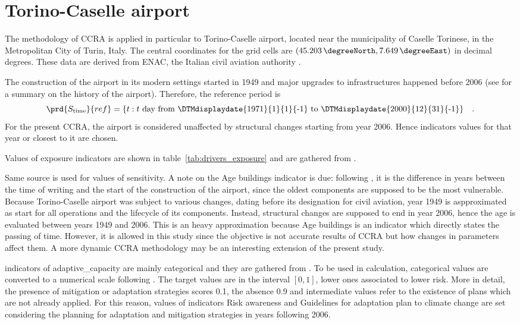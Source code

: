 \section{Torino-Caselle airport}
The methodology of \gls{CCRA} is applied in particular to Torino-Caselle airport, located near the municipality of Caselle Torinese, in the Metropolitan City of Turin, Italy.
The central coordinates for the grid cells are $(\qty{45.203}{\degreeNorth}, \qty{7.649}{\degreeEast})$ in decimal degrees. These data are derived from \gls{ENAC}, the Italian civil aviation authority \cite{2014ENACTorinoCaselle}.

The construction of the airport in its modern settings started in 1949 and major upgrades to infrastructures happened before 2006 (see \cite[18]{2015PudduCorporateSocial} for a summary on the history of the airport). Therefore, the reference period is
\begin{equation}
  \label{eq:period_reference_torino}
  \prd{S_\text{time}}{ref} = \{ t : \text{$t$ day from \DTMdisplaydate{1971}{1}{1}{-1} to \DTMdisplaydate{2000}{12}{31}{-1}} \}
  \quad .
\end{equation}
For the present \gls{CCRA}, the airport is considered unaffected by structural changes starting from year 2006. Hence \glspl{indicator} values for that year or closest to it are chosen.

Values of \gls{exposure} indicators are shown in table~\ref{tab:drivers_exposure} and are gathered from \cite[154-179]{2010OneWorksAtlanteDegli}.

Same source is used for values of \gls{sensitivity}. A note on the {Age buildings} indicator is due: following \cite[5]{2022DeVivoRiskAssessment}, it is the difference in years between the time of writing and the start of the construction of the airport, since the oldest components are supposed to be the most vulnerable. Because Torino-Caselle airport was subject to various changes, dating before its designation for civil aviation, year 1949 is aspproximated as start for all operations and the lifecycle of its components. Instead, structural changes are supposed to end in year 2006, hence the age is evaluated between years 1949 and 2006. This is an heavy approximation because {Age buildings} is an indicator which directly states the passing of time. However, it is allowed in this study since the objective is not accurate results of \gls{CCRA} but how changes in parameters affect them. A more dynamic \gls{CCRA} methodology may be an interesting extension of the present study.

\Glspl{indicator} of \gls{adaptive_capacity} are mainly categorical and they are gathered from \cite[66-79]{2015PudduCorporateSocial}. To be used in calculation, categorical values are converted to a numerical scale following \cite[6]{2023DeVivoClimate-RiskAssessment}. The target values are in the interval $[0, 1]$, lower ones associated to lower \gls{risk}. More in detail, the presence of mitigation or adaptation strategies scores \num{0.1}, the absence \num{0.9} and intermediate values refer to the existence of plans which are not already applied. For this reason, values of indicators {Risk awareness} and {Guidelines for adaptation plan to climate change} are set considering the planning for adaptation and mitigation strategies in years following 2006.

